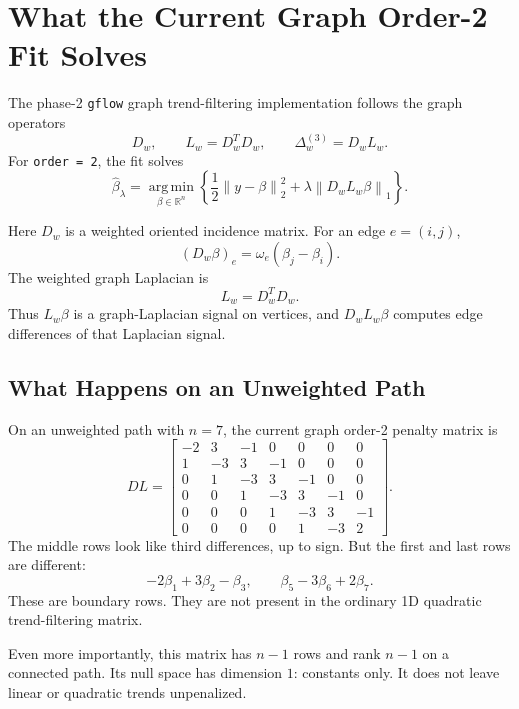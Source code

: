 \documentclass[11pt]{article}
\newcommand{\R}{\mathbb R}
\newcommand{\norm}[1]{\left\lVert #1 \right\rVert}
\newcommand{\argmin}{\operatorname*{arg\,min}}
\begin{document}
\section{What the Current Graph Order-2 Fit Solves}

The phase-2 \texttt{gflow} graph trend-filtering implementation follows the
graph operators
\[
  D_w,\qquad L_w = D_w^T D_w,\qquad \Delta_w^{(3)} = D_wL_w.
\]
For \texttt{order = 2}, the fit solves
\[
  \widehat\beta_\lambda
  =
  \argmin_{\beta\in\R^n}
  \left\{
    \frac{1}{2}\norm{y-\beta}_2^2
    +
    \lambda\norm{D_wL_w\beta}_1
  \right\}.
\]

Here \(D_w\) is a weighted oriented incidence matrix.  For an edge
\(e=(i,j)\),
\[
  (D_w\beta)_e = \omega_e(\beta_j-\beta_i).
\]
The weighted graph Laplacian is
\[
  L_w = D_w^TD_w.
\]
Thus \(L_w\beta\) is a graph-Laplacian signal on vertices, and \(D_wL_w\beta\)
computes edge differences of that Laplacian signal.

\subsection{What Happens on an Unweighted Path}

On an unweighted path with \(n=7\), the current graph order-2 penalty matrix is
\[
D L
=
\begin{bmatrix}
-2 &  3 & -1 &  0 &  0 &  0 &  0\\
 1 & -3 &  3 & -1 &  0 &  0 &  0\\
 0 &  1 & -3 &  3 & -1 &  0 &  0\\
 0 &  0 &  1 & -3 &  3 & -1 &  0\\
 0 &  0 &  0 &  1 & -3 &  3 & -1\\
 0 &  0 &  0 &  0 &  1 & -3 &  2
\end{bmatrix}.
\]
The middle rows look like third differences, up to sign.  But the first and
last rows are different:
\[
  -2\beta_1 + 3\beta_2 - \beta_3,
  \qquad
  \beta_5 - 3\beta_6 + 2\beta_7.
\]
These are boundary rows.  They are not present in the ordinary 1D quadratic
trend-filtering matrix.

Even more importantly, this matrix has \(n-1\) rows and rank \(n-1\) on a
connected path.  Its null space has dimension \(1\): constants only.  It does
not leave linear or quadratic trends unpenalized.
\end{document}

